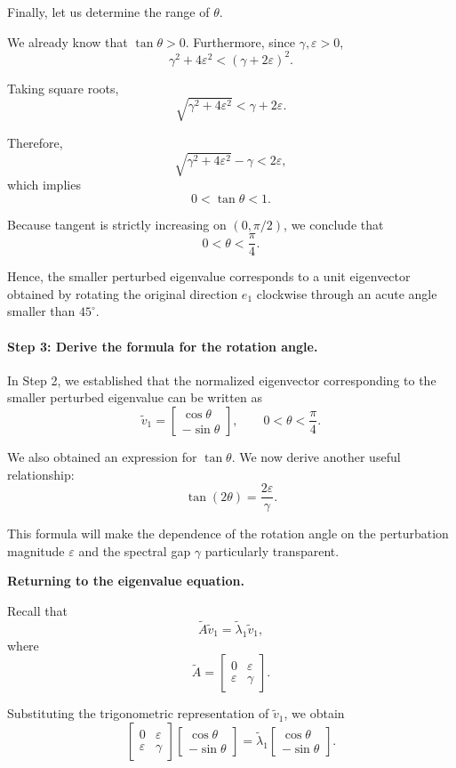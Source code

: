 \documentclass[14pt,letterpaper]{article}
\theoremstyle{plain}
\theoremstyle{definition}
\theoremstyle{remark}
\begin{document}
Finally, let us determine the range of $\theta$.

We already know that $\tan\theta>0$.
Furthermore, since $\gamma,\varepsilon>0$,
\[
\gamma^2+4\varepsilon^2
<
(\gamma+2\varepsilon)^2.
\]

Taking square roots,
\[
\sqrt{\gamma^2+4\varepsilon^2}
<
\gamma+2\varepsilon.
\]

Therefore,
\[
\sqrt{\gamma^2+4\varepsilon^2}-\gamma
<
2\varepsilon,
\]
which implies
\[
\boxed{0<\tan\theta<1.}
\]

Because tangent is strictly increasing on
$(0,\pi/2)$, we conclude that
\[
\boxed{
0<\theta<\frac{\pi}{4}.
}
\]

Hence, the smaller perturbed eigenvalue
corresponds to a unit eigenvector obtained
by rotating the original direction $e_1$
clockwise through an acute angle
smaller than $45^\circ$.

\paragraph{Step 3: Derive the formula for the rotation angle.}

In Step 2, we established that the normalized eigenvector
corresponding to the smaller perturbed eigenvalue can be
written as
\[
\boxed{
\widetilde v_1=
\begin{bmatrix}
\cos\theta\\
-\sin\theta
\end{bmatrix},
\qquad
0<\theta<\frac{\pi}{4}.
}
\]

We also obtained an expression for $\tan\theta$.
We now derive another useful relationship:
\[
\boxed{
\tan(2\theta)=\frac{2\varepsilon}{\gamma}.
}
\]

This formula will make the dependence of the rotation
angle on the perturbation magnitude $\varepsilon$
and the spectral gap $\gamma$ particularly transparent.

\medskip

\noindent\textbf{Returning to the eigenvalue equation.}

Recall that
\[
\widetilde A\widetilde v_1
=
\widetilde\lambda_1\widetilde v_1,
\]
where
\[
\widetilde A=
\begin{bmatrix}
0&\varepsilon\\
\varepsilon&\gamma
\end{bmatrix}.
\]

Substituting the trigonometric representation of
$\widetilde v_1$, we obtain
\[
\begin{bmatrix}
0&\varepsilon\\
\varepsilon&\gamma
\end{bmatrix}
\begin{bmatrix}
\cos\theta\\
-\sin\theta
\end{bmatrix}
=
\widetilde\lambda_1
\begin{bmatrix}
\cos\theta\\
-\sin\theta
\end{bmatrix}.
\]
\end{document}
